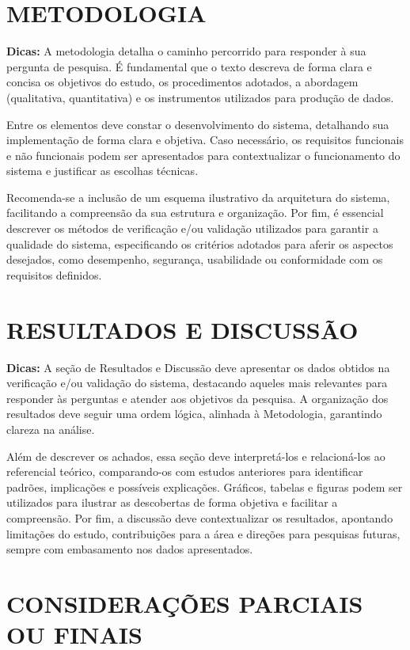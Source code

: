 \documentclass[
	article,			%
	12pt,				%
	oneside,			%
	a4paper,			%
	english,			%
	brazil,				%
	sumario=tradicional
]{abntex2}
\begin{document}
\section{METODOLOGIA}

\textbf{Dicas:} A metodologia detalha o caminho percorrido para responder à
sua pergunta de pesquisa. É fundamental que o texto descreva de forma clara e
concisa os objetivos do estudo, os procedimentos adotados, a abordagem
(qualitativa, quantitativa) e os instrumentos utilizados para produção de
dados.

Entre os elementos deve constar o desenvolvimento do sistema, detalhando sua
implementação de forma clara e objetiva. Caso necessário, os requisitos
funcionais e não funcionais podem ser apresentados para contextualizar o
funcionamento do sistema e justificar as escolhas técnicas.

Recomenda-se a inclusão de um esquema ilustrativo da arquitetura do sistema,
facilitando a compreensão da sua estrutura e organização. Por fim, é
essencial descrever os métodos de verificação e/ou validação utilizados para
garantir a qualidade do sistema, especificando os critérios adotados para
aferir os aspectos desejados, como desempenho, segurança, usabilidade ou
conformidade com os requisitos definidos.

\section{RESULTADOS E DISCUSSÃO}

\textbf{Dicas:} A seção de Resultados e Discussão deve apresentar os dados
obtidos na verificação e/ou validação do sistema, destacando aqueles mais
relevantes para responder às perguntas e atender aos objetivos da pesquisa.
A organização dos resultados deve seguir uma ordem lógica, alinhada à
Metodologia, garantindo clareza na análise.

Além de descrever os achados, essa seção deve interpretá-los e
relacioná-los ao referencial teórico, comparando-os com estudos anteriores
para identificar padrões, implicações e possíveis explicações. Gráficos,
tabelas e figuras podem ser utilizados para ilustrar as descobertas de forma
objetiva e facilitar a compreensão. Por fim, a discussão deve contextualizar
os resultados, apontando limitações do estudo, contribuições para a área e
direções para pesquisas futuras, sempre com embasamento nos dados
apresentados.

\section{CONSIDERAÇÕES PARCIAIS OU FINAIS}
\end{document}
